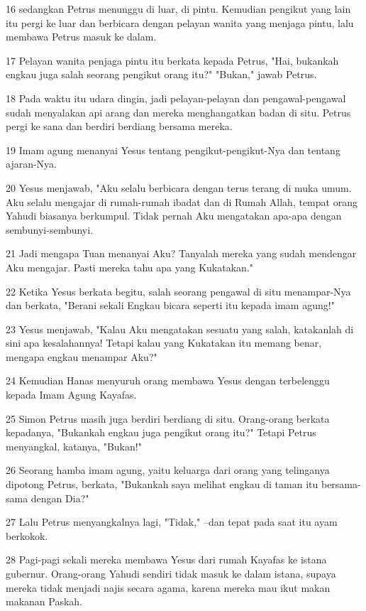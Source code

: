 \par 16 sedangkan Petrus menunggu di luar, di pintu. Kemudian pengikut yang lain itu pergi ke luar dan berbicara dengan pelayan wanita yang menjaga pintu, lalu membawa Petrus masuk ke dalam.
\par 17 Pelayan wanita penjaga pintu itu berkata kepada Petrus, "Hai, bukankah engkau juga salah seorang pengikut orang itu?" "Bukan," jawab Petrus.
\par 18 Pada waktu itu udara dingin, jadi pelayan-pelayan dan pengawal-pengawal sudah menyalakan api arang dan mereka menghangatkan badan di situ. Petrus pergi ke sana dan berdiri berdiang bersama mereka.
\par 19 Imam agung menanyai Yesus tentang pengikut-pengikut-Nya dan tentang ajaran-Nya.
\par 20 Yesus menjawab, "Aku selalu berbicara dengan terus terang di muka umum. Aku selalu mengajar di rumah-rumah ibadat dan di Rumah Allah, tempat orang Yahudi biasanya berkumpul. Tidak pernah Aku mengatakan apa-apa dengan sembunyi-sembunyi.
\par 21 Jadi mengapa Tuan menanyai Aku? Tanyalah mereka yang sudah mendengar Aku mengajar. Pasti mereka tahu apa yang Kukatakan."
\par 22 Ketika Yesus berkata begitu, salah seorang pengawal di situ menampar-Nya dan berkata, "Berani sekali Engkau bicara seperti itu kepada imam agung!"
\par 23 Yesus menjawab, "Kalau Aku mengatakan sesuatu yang salah, katakanlah di sini apa kesalahannya! Tetapi kalau yang Kukatakan itu memang benar, mengapa engkau menampar Aku?"
\par 24 Kemudian Hanas menyuruh orang membawa Yesus dengan terbelenggu kepada Imam Agung Kayafas.
\par 25 Simon Petrus masih juga berdiri berdiang di situ. Orang-orang berkata kepadanya, "Bukankah engkau juga pengikut orang itu?" Tetapi Petrus menyangkal, katanya, "Bukan!"
\par 26 Seorang hamba imam agung, yaitu keluarga dari orang yang telinganya dipotong Petrus, berkata, "Bukankah saya melihat engkau di taman itu bersama-sama dengan Dia?"
\par 27 Lalu Petrus menyangkalnya lagi, "Tidak," --dan tepat pada saat itu ayam berkokok.
\par 28 Pagi-pagi sekali mereka membawa Yesus dari rumah Kayafas ke istana gubernur. Orang-orang Yahudi sendiri tidak masuk ke dalam istana, supaya mereka tidak menjadi najis secara agama, karena mereka mau ikut makan makanan Paskah.
